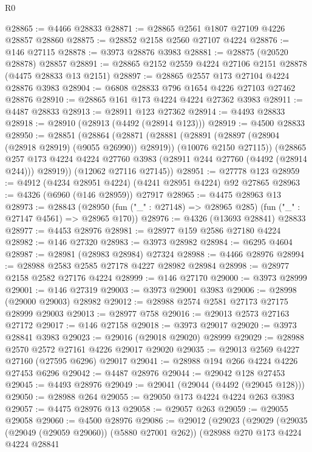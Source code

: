 \begin{lexlean}{R0}
\begin{coremodule}
@28865 := @4466 @28833
@28871 := @28865 @2561 @1807 @27109 @4226 @28857 @28860
@28875 := @28852 @2158 @2560 @27107 @4224
@28876 := @146 @27115
@28878 := @3973 @28876 @3983
@28881 := @28875 (@20520 @28878) @28857
@28891 := @28865 @2152 @2559 @4224 @27106 @2151 @28878 (@4475 @28833 @13 @2151)
@28897 := @28865 @2557 @173 @27104 @4224 @28876 @3983
@28904 := @6808 @28833 @796 @1654 @4226 @27103 @27462 @28876
@28910 := @28865 @161 @173 @4224 @4224 @27362 @3983
@28911 := @4487 @28833
@28913 := @28911 @123 @27362
@28914 := @4493 @28833
@28918 := @28910 (@28913 (@4492 (@28914 @123)))
@28919 := @4500 @28833
@28950 := @28851
    (@28864
      (@28871
        (@28881
          (@28891 (@28897 (@28904 (@28918 @28919) (@9055 @26990)) @28919))
          (@10076 @2150 @27115))
        (@28865
          @257
          @173
          @4224
          @4224
          @27760
          @3983
          (@28911 @244 @27760 (@4492 (@28914 @244)))
          @28919))
      (@12062 @27116 @27145))
@28951 := @27778 @123
@28959 := @4912 (@4234 @28951 @4224) (@4241 @28951 @4224) @92 @27865
@28963 := @4326 (@6960 (@146 @28959)) @27917
@28965 := @4475 @28963 @13
@28973 := @28843
    (@28950 (fun ("_" : @27148) => @28965 @285) (fun ("_" : @27147 @4561) => @28965 @170))
@28976 := @4326 (@13693 @28841) @28833
@28977 := @4453 @28976
@28981 := @28977 @159 @2586 @27180 @4224
@28982 := @146 @27320
@28983 := @3973 @28982
@28984 := @6295 @4604
@28987 := @28981 (@28983 @28984) @27324
@28988 := @4466 @28976
@28994 := @28988 @2583 @2585 @27178 @4227 @28982 @28984
@28998 := @28977 @2158 @2582 @27176 @4224
@28999 := @146 @27170
@29000 := @3973 @28999
@29001 := @146 @27319
@29003 := @3973 @29001 @3983
@29006 := @28998 (@29000 @29003) @28982
@29012 := @28988 @2574 @2581 @27173 @27175 @28999 @29003
@29013 := @28977 @758
@29016 := @29013 @2573 @27163 @27172
@29017 := @146 @27158
@29018 := @3973 @29017
@29020 := @3973 @28841 @3983
@29023 := @29016 (@29018 @29020) @28999
@29029 := @28988 @2570 @2572 @27161 @4226 @29017 @29020
@29035 := @29013 @2569 @4227 @27160 (@27595 @6296) @29017
@29041 := @28988 @194 @266 @4224 @4226 @27453 @6296
@29042 := @4487 @28976
@29044 := @29042 @128 @27453
@29045 := @4493 @28976
@29049 := @29041 (@29044 (@4492 (@29045 @128)))
@29050 := @28988 @264
@29055 := @29050 @173 @4224 @4224 @263 @3983
@29057 := @4475 @28976 @13
@29058 := @29057 @263
@29059 := @29055 @29058
@29060 := @4500 @28976
@29086 := @29012
    (@29023
      (@29029
        (@29035 (@29049 (@29059 @29060)) (@5880 @27001 @262))
        (@28988
          @270
          @173
          @4224
          @4224
          @28841

\end{coremodule}
\end{lexlean}
